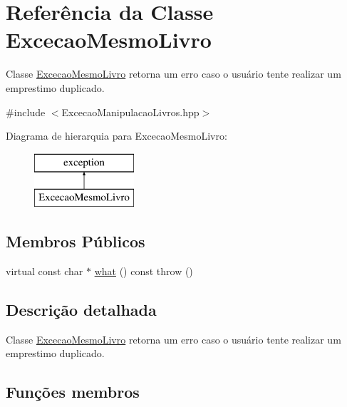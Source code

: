 \hypertarget{class_excecao_mesmo_livro}{}\section{Referência da Classe Excecao\+Mesmo\+Livro}
\label{class_excecao_mesmo_livro}


Classe \mbox{\hyperlink{class_excecao_mesmo_livro}{Excecao\+Mesmo\+Livro}} retorna um erro caso o usuário tente realizar um emprestimo duplicado.  




{\ttfamily \#include $<$Excecao\+Manipulacao\+Livros.\+hpp$>$}

Diagrama de hierarquia para Excecao\+Mesmo\+Livro\+:\begin{figure}[H]
\begin{center}
\leavevmode
\includegraphics[height=2.000000cm]{class_excecao_mesmo_livro}
\end{center}
\end{figure}
\subsection*{Membros Públicos}
\begin{DoxyCompactItemize}
\item 
virtual const char $\ast$ \mbox{\hyperlink{class_excecao_mesmo_livro_a02d6fbd0ba8db96495f9b9fc0d353b61}{what}} () const  throw ()
\end{DoxyCompactItemize}


\subsection{Descrição detalhada}
Classe \mbox{\hyperlink{class_excecao_mesmo_livro}{Excecao\+Mesmo\+Livro}} retorna um erro caso o usuário tente realizar um emprestimo duplicado. 

\subsection{Funções membros}
\mbox{\label{class_excecao_mesmo_livro_a02d6fbd0ba8db96495f9b9fc0d353b61}} 
